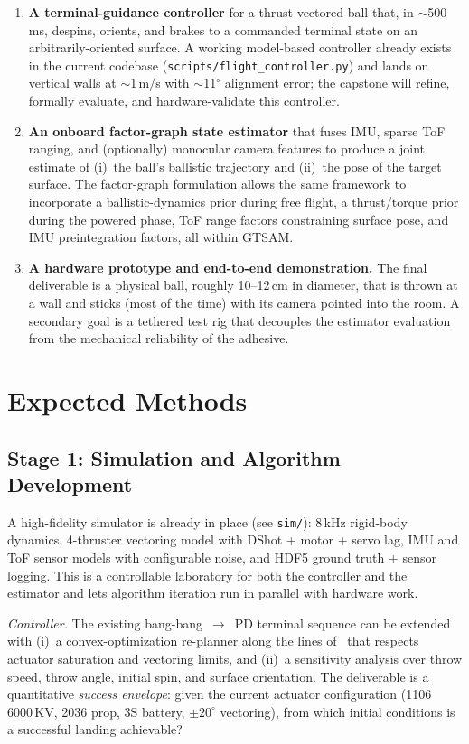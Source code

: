 \documentclass[11pt]{article}
\begin{document}
\begin{enumerate}[leftmargin=*]
\item \textbf{A terminal-guidance controller} for a thrust-vectored ball
  that, in $\sim$500\,ms, despins, orients, and brakes to a commanded
  terminal state on an arbitrarily-oriented surface. A working
  model-based controller already exists in the current codebase
  (\texttt{scripts/flight\_controller.py}) and lands on vertical walls at
  $\sim$1\,m/s with $\sim$11$^{\circ}$ alignment error; the capstone will
  refine, formally evaluate, and hardware-validate this controller.
\item \textbf{An onboard factor-graph state estimator} that fuses IMU,
  sparse ToF ranging, and (optionally) monocular camera features to
  produce a joint estimate of (i)~the ball's ballistic trajectory and
  (ii)~the pose of the target surface. The factor-graph formulation
  allows the same framework to incorporate a ballistic-dynamics prior
  during free flight, a thrust/torque prior during the powered phase,
  ToF range factors constraining surface pose, and IMU preintegration
  factors, all within GTSAM.
\item \textbf{A hardware prototype and end-to-end demonstration.} The
  final deliverable is a physical ball, roughly 10--12\,cm in diameter,
  that is thrown at a wall and sticks (most of the
  time) with its camera pointed into the room. A
  secondary goal is a tethered test rig that decouples the estimator
  evaluation from the mechanical reliability of the adhesive.
\end{enumerate}

\section{Expected Methods}

\subsection{Stage 1: Simulation and Algorithm Development}

A high-fidelity simulator is already in place (see \texttt{sim/}): 8\,kHz
rigid-body dynamics, 4-thruster vectoring model with DShot + motor + servo
lag, IMU and ToF sensor models with configurable noise, and HDF5 ground
truth + sensor logging. This is a controllable laboratory for both the
controller and the estimator and lets algorithm iteration run in parallel
with hardware work.

\emph{Controller.} The existing bang-bang~$\rightarrow$~PD terminal sequence
can be extended with (i)~a convex-optimization re-planner along the lines
of~\cite{acikmese2007,szmuk2020} that respects actuator saturation and
vectoring limits, and (ii)~a sensitivity analysis over throw speed, throw
angle, initial spin, and surface orientation. The deliverable is a
quantitative \emph{success envelope}: given the current actuator
configuration (1106 6000\,KV, 2036 prop, 3S battery, $\pm 20^{\circ}$
vectoring), from which initial conditions is a successful landing
achievable?
\end{document}
